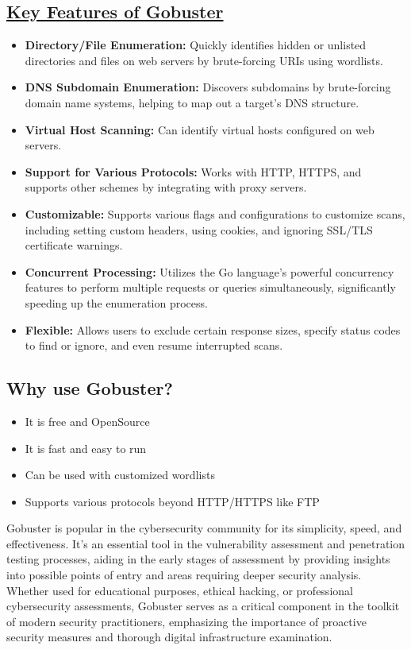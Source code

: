 \documentclass[12 pt]{article}
\begin{document}
\subsection{\underline{Key Features of Gobuster}}
\begin{itemize}
    \item \textbf{Directory/File Enumeration:} Quickly identifies hidden or unlisted directories and files on web servers by brute-forcing URIs using wordlists.
    \item \textbf{DNS Subdomain Enumeration:} Discovers subdomains by brute-forcing domain name systems, helping to map out a target's DNS structure.
    \item \textbf{Virtual Host Scanning:} Can identify virtual hosts configured on web servers.
    \item \textbf{Support for Various Protocols:} Works with HTTP, HTTPS, and supports other schemes by integrating with proxy servers.
    \item \textbf{Customizable:} Supports various flags and configurations to customize scans, including setting custom headers, using cookies, and ignoring SSL/TLS certificate warnings.
    \item \textbf{Concurrent Processing:} Utilizes the Go language's powerful concurrency features to perform multiple requests or queries simultaneously, significantly speeding up the enumeration process.
    \item \textbf{Flexible:} Allows users to exclude certain response sizes, specify status codes to find or ignore, and even resume interrupted scans.
\end{itemize} 

\subsection{Why use Gobuster?}
\begin{itemize}
\item It is free and OpenSource
\item It is fast and easy to run
\item Can be used with customized wordlists
\item Supports various protocols beyond HTTP/HTTPS like FTP
\end{itemize} 
Gobuster is popular in the cybersecurity community for its simplicity, speed, and effectiveness. It's an essential tool in the vulnerability assessment and penetration testing processes, aiding in the early stages of assessment by providing insights into possible points of entry and areas requiring deeper security analysis. Whether used for educational purposes, ethical hacking, or professional cybersecurity assessments, Gobuster serves as a critical component in the toolkit of modern security practitioners, emphasizing the importance of proactive security measures and thorough digital infrastructure examination.
\end{document}
